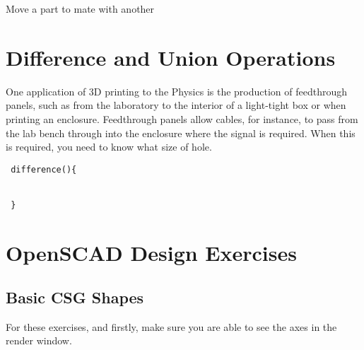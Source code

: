  

 
 Move a part to mate with another


\section{Difference and Union Operations}

One application of 3D printing to the Physics is the production of feedthrough panels, such as from the laboratory to the interior of a light-tight box or when printing an enclosure. Feedthrough panels allow cables, for instance, to pass from the lab bench through into the enclosure where the signal is required. When this is required, you need to know what size of hole. 

\begin{verbatim}
 difference(){
    
 
 }
\end{verbatim}






\section{OpenSCAD Design Exercises}
\label{sn:design_exercises}
\subsection{Basic CSG Shapes}

For these exercises, and firstly, make sure you are able to see the axes in the render window. 

